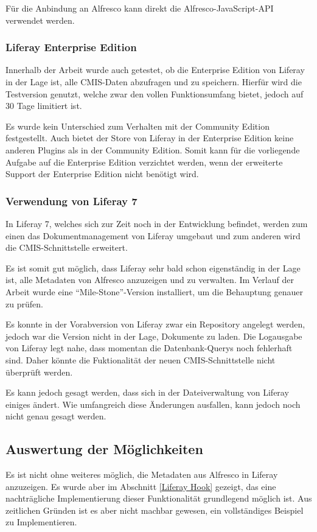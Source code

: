 F\"ur die Anbindung an Alfresco kann direkt die Alfresco-JavaScript-\ac{API} verwendet werden.

\subsubsection{Liferay Enterprise Edition}\label{Liferay EE}
Innerhalb der Arbeit wurde auch getestet, ob die Enterprise Edition von Liferay in der Lage ist, alle \ac{CMIS}-Daten abzufragen und zu speichern. Hierf\"ur wird die Testversion genutzt, welche zwar den vollen Funktionsumfang bietet, jedoch auf 30 Tage limitiert ist.

Es wurde kein Unterschied zum Verhalten mit der Community Edition festgestellt. Auch bietet der Store von Liferay in der Enterprise Edition keine anderen Plugins als in der Community Edition. Somit kann f\"ur die vorliegende Aufgabe auf die Enterprise Edition verzichtet werden, wenn der erweiterte Support der Enterprise Edition nicht ben\"otigt wird.

\subsubsection{Verwendung von Liferay 7}\label{Liferay 7}
In Liferay 7, welches sich zur Zeit noch in der Entwicklung befindet, werden zum einen das Dokumentmanagement von Liferay umgebaut und zum anderen wird die \ac{CMIS}-Schnittstelle erweitert. \cite{liferay7}

Es ist somit gut m\"oglich, dass Liferay sehr bald schon eigenst\"andig in der Lage ist, alle Metadaten von Alfresco anzuzeigen und zu verwalten.
Im Verlauf der Arbeit wurde eine "`Mile-Stone"'-Version installiert, um die Behauptung genauer zu pr\"ufen.

Es konnte in der Vorabversion von Liferay zwar ein Repository angelegt werden, jedoch war die Version nicht in der Lage, Dokumente zu laden. Die Logausgabe von Liferay legt nahe, dass momentan die Datenbank-Querys noch fehlerhaft sind. Daher k\"onnte die Fuktionalit\"at der neuen \ac{CMIS}-Schnittstelle nicht \"uberpr\"uft werden.

Es kann jedoch gesagt werden, dass sich in der Dateiverwaltung von Liferay einiges \"andert. Wie umfangreich diese \"Anderungen ausfallen, kann jedoch noch nicht genau gesagt werden.

\subsection{Auswertung der M\"oglichkeiten}
Es ist nicht ohne weiteres m\"oglich, die Metadaten aus Alfresco in Liferay anzuzeigen. Es wurde aber im Abschnitt \ref{Liferay Hook} gezeigt, das eine nachtr\"agliche Implementierung dieser Funktionalit\"at grundlegend m\"oglich ist. Aus zeitlichen Gr\"unden ist es aber nicht machbar gewesen, ein vollst\"andiges Beispiel zu Implementieren.

